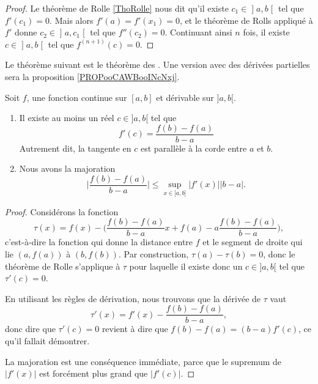 \begin{proof}
	Le théorème de Rolle \ref{ThoRolle} nous dit qu'il existe \( c_1\in \mathopen] a , b \mathclose[\) tel que \( f'(c_1)=0\). Mais alors \( f'(a)=f'(x_1)=0\), et le théorème de Rolls appliqué à \( f'\) donne \( c_2\in \mathopen] a , c_1 \mathclose[\) tel que \( f''(c_2)=0\). Continuant ainsi \( n\) fois, il existe \( c\in \mathopen] a ,b\mathclose[\) tel que \( f^{(n+1)}(c)=0\).
\end{proof}

Le théorème suivant est le théorème des . Une version avec des dérivées partielles sera la proposition \ref{PROPooCAWBooINcNxj}.
\begin{theorem}       \label{ThoAccFinis}
	Soit \( f\), une fonction continue sur \( [a,b]\) et dérivable sur \( ]a,b[\).
	\begin{enumerate}
		\item       \label{ITEMooFZONooXJqLyX}
		      Il existe au moins un réel \( c\in]a,b[\) tel que
		      \begin{equation}
			      f'(c)=\frac{ f(b)-f(a) }{ b-a }
		      \end{equation}
		      Autrement dit, la tangente en \( c\) est parallèle à la corde entre \( a\) et \( b\).
		\item       \label{ITEMooXRQKooDBFpdQ}
		      Nous avons la majoration
		      \begin{equation}
			      \big| \frac{ f(b)-f(a) }{ b-a } \big| \leq \sup_{x\in\mathopen[ a , b \mathclose]}| f'(x) |  | b-a |.
		      \end{equation}
	\end{enumerate}
\end{theorem}

\begin{proof}
	Considérons la fonction
	\begin{equation}
		\tau(x)=f(x)-\big( \frac{ f(b)-f(a) }{ b-a }x + f(a) - a\frac{ f(b)-f(a) }{ b-a } \big),
	\end{equation}
	c'est-à-dire la fonction qui donne la distance entre \( f\) et le segment de droite qui lie \( (a,f(a))\) à \( (b,f(b))\). Par construction, \( \tau(a)-\tau(b)=0\), donc le théorème de Rolle s'applique à \( \tau\) pour laquelle il existe donc un \( c\in]a,b[\) tel que \( \tau'(c)=0\).

	En utilisant les règles de dérivation, nous trouvons que la dérivée de \( \tau\) vaut
	\begin{equation}
		\tau'(x)= f'(x)-\frac{ f(b)-f(a) }{ b-a },
	\end{equation}
	donc dire que \( \tau'(c)=0\) revient à dire que \( f(b)-f(a)=(b-a)f'(c)\), ce qu'il fallait démontrer.

	La majoration est une conséquence immédiate, parce que le supremum de \( | f'(x) |\) est forcément plus grand que \( | f'(c) |\).
\end{proof}

